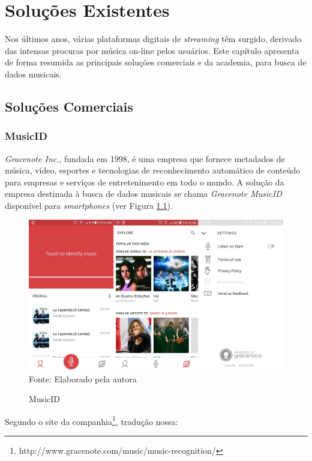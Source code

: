 \chapter{Soluções Existentes} \label{cap:solucoes}
Nos últimos anos, várias plataformas digitais de \textit{streaming} têm surgido, derivado das intensas procuras por música on-line pelos usuários. Este capítulo apresenta de forma resumida as principais soluções comerciais e da academia, para busca de dados musicais.

\section{Soluções Comerciais} \label{sec:comercial}

\subsection{MusicID} \label{subsec:musicid}
\textit{Gracenote Inc.}, fundada em 1998, é uma empresa que fornece metadados de música, vídeo, esportes e tecnologias de reconhecimento automático de conteúdo para empresas e serviços de entretenimento em todo o mundo. A solução da empresa destinada à busca de dados musicais se chama \textit{Gracenote MusicID\textregistered} disponível para \textit{smartphones} (ver Figura \ref{fig:musicID}).

\begin{figure}[!htb]
   \centering
   \caption{MusicID}\label{fig:musicID} 
   \includegraphics[scale=0.17]{figuras/MusicID.jpg}
   \\Fonte: Elaborado pela autora
\end{figure}

Segundo o site da companhia\footnote{http://www.gracenote.com/music/music-recognition/}, tradução nossa:


